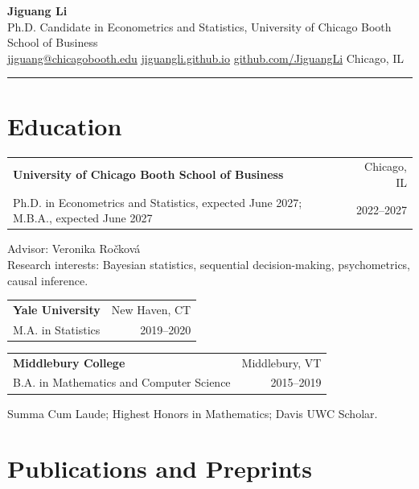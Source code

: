 \documentclass[11pt,letterpaper]{article}
\makeatletter
\newcommand{\entry}[4]{%
  \begin{tabularx}{\textwidth}{@{}Xr@{}}
    \textbf{#1} & #2 \\
    #3 & #4
  \end{tabularx}%
}
\makeatother
\begin{document}

\begin{center}
  {\LARGE\bfseries Jiguang Li}\\[0.18em]
  Ph.D. Candidate in Econometrics and Statistics,
  University of Chicago Booth School of Business\\[0.22em]
  \href{mailto:jiguang@chicagobooth.edu}{jiguang@chicagobooth.edu}
  \enspace\textbullet\enspace
  \href{https://jiguangli.github.io/}{jiguangli.github.io}
  \enspace\textbullet\enspace
  \href{https://github.com/JiguangLi}{github.com/JiguangLi}
  \enspace\textbullet\enspace
  Chicago, IL
\end{center}

\vspace{0.18em}
\hrule

\section*{Education}

\entry
  {University of Chicago Booth School of Business}
  {Chicago, IL}
  {Ph.D. in Econometrics and Statistics, expected June 2027; M.B.A., expected June 2027}
  {2022--2027}

\vspace{0.08em}
Advisor: Veronika Ro\v{c}kov\'{a}\\[-0.02em]
Research interests: Bayesian statistics, sequential decision-making,
psychometrics, causal inference.

\vspace{0.45em}

\entry
  {Yale University}
  {New Haven, CT}
  {M.A. in Statistics}
  {2019--2020}

\vspace{0.45em}

\entry
  {Middlebury College}
  {Middlebury, VT}
  {B.A. in Mathematics and Computer Science}
  {2015--2019}

\vspace{0.08em}
Summa Cum Laude; Highest Honors in Mathematics; Davis UWC Scholar.

\section*{Publications and Preprints}
\end{document}
